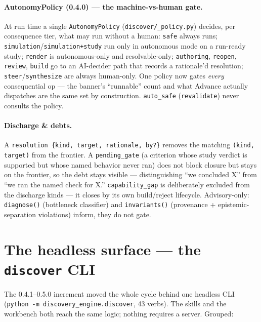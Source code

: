 \documentclass[11pt]{article}
\newcommand{\code}[1]{\texttt{\small #1}}
\begin{document}
\paragraph{AutonomyPolicy (0.4.0) --- the machine-vs-human gate.} At run time a single
\code{AutonomyPolicy} (\code{discover/\_policy.py}) decides, per consequence tier, what may run
without a human: \code{safe} always runs; \code{simulation}/\code{simulation+study} run only in
autonomous mode on a run-ready study; \code{render} is autonomous-only and resolvable-only;
\code{authoring}, \code{reopen}, \code{review}, \code{build} go to an AI-decider path that records
a rationale'd resolution; \code{steer}/\code{synthesize} are always human-only. One policy now gates
\emph{every} consequential op --- the banner's ``runnable'' count and what Advance actually
dispatches are the same set by construction. \code{auto\_safe} (\code{revalidate}) never consults
the policy.

\paragraph{Discharge \& debts.} A \code{resolution \{kind, target, rationale, by?\}} removes the
matching \code{(kind, target)} from the frontier. A \code{pending\_gate} (a criterion whose study
verdict is supported but whose named behavior never ran) does not block closure but stays on the
frontier, so the debt stays visible --- distinguishing ``we concluded X'' from ``we ran the named
check for X.'' \code{capability\_gap} is deliberately excluded from the discharge kinds --- it
closes by its own build/reject lifecycle. Advisory-only: \code{diagnose()} (bottleneck
classifier) and \code{invariants()} (provenance + epistemic-separation violations) inform, they
do not gate.

\section{The headless surface --- the \code{discover} CLI}\label{sec:cli}

The 0.4.1--0.5.0 increment moved the whole cycle behind one headless CLI
(\code{python -m discovery\_engine.discover}, 43 verbs). The skills and the workbench both reach
the same logic; nothing requires a server. Grouped:
\end{document}
